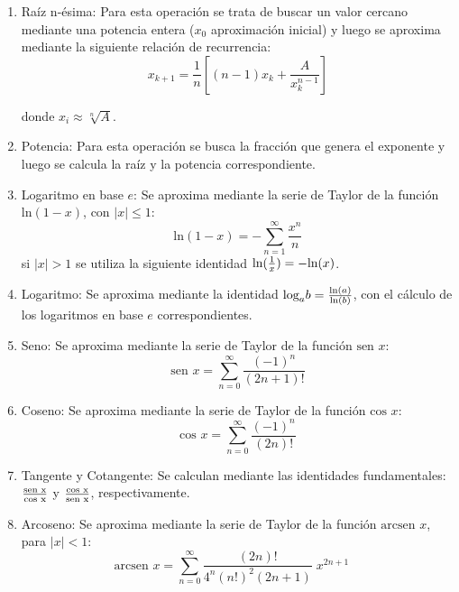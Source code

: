\documentclass[a4paper,10pt,twocolumn]{article}
\begin{document}
	\begin{enumerate}
		\item Raíz n-ésima: Para esta operación se trata de buscar un valor cercano mediante una potencia entera ($x_0$ aproximación inicial) y luego se aproxima mediante la siguiente relación de recurrencia:
			\begin{equation}
				x_ {k + 1} = {\frac {1} {n}} \left [{(n-1) x_ {k} + {\frac {A} {x_ {k} ^ {n-1}}}} \right]
			\end{equation}
		
		donde $x_i\approx \sqrt[n]{A}$.
			
		\item Potencia: Para esta operación se busca la fracción que genera el exponente y luego se calcula la raíz y la potencia correspondiente.
  		
  		\item Logaritmo en base $e$: Se aproxima mediante la serie de Taylor de la función $\text{ln}(1-x)$, con $|x| \leq 1$:
  			\begin{equation}
  				\text{ln}(1-x)=-\sum _{n=1}^{\infty }{\frac {x^{n}}{n}}
			\end{equation}  			 
			si $|x| > 1$ se utiliza la siguiente identidad $\text{ln}({1\over x})=-\text{ln}(x)$.
			
		\item Logaritmo: Se aproxima mediante la identidad $\text{log}_a b={\text{ln}(a)\over \text{ln}(b)}$, con el cálculo de los logaritmos en base $e$ correspondientes.
		
		\item Seno: Se aproxima mediante la serie de Taylor de la función $\text{sen }x$:
  			\begin{equation}
  				\text{sen } x=\sum _{n=0}^{\infty }{\frac {(-1)^{n}}{(2n+1)!}}
  			\end{equation}
  			
  		\item Coseno: Se aproxima mediante la serie de Taylor de la función $\text{cos }x$:
  			\begin{equation}
  				\text{cos } x=\sum _{n=0}^{\infty }{\frac {(-1)^{n}}{(2n)!}}
  			\end{equation}
  			
  		\item Tangente y Cotangente: Se calculan mediante las identidades fundamentales: $\text{sen x}\over \text{cos x}$ y $\text{cos x}\over \text{sen x}$, respectivamente.
  			
  		\item Arcoseno: Se aproxima mediante la serie de Taylor de la función $\text{arcsen }x$, para $\left|x\right|<1$:
  			\begin{equation}
  				\text{arcsen }x=\sum _{n=0}^{\infty }{\frac {(2n)!}{4^{n}(n!)^{2}(2n+1)}}\;x^{2n+1}\quad
  			\end{equation}
  			

\end{enumerate}
\end{document}
